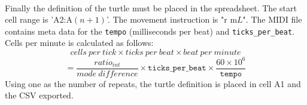 \paragraph{} Finally the definition of the turtle must be placed in the spreadsheet. The start cell range is 'A2:A$(n+1)$'. The movement instruction is "r m$L$". The MIDI file contains meta data for the \texttt{tempo} (milliseconds per beat) and \texttt{ticks\_per\_beat}. Cells per minute is calculated as follows:
  $$cells\ per\ tick \times ticks\ per\ beat \times beat\ per\ minute$$
  $$= \frac{ratio_{int}}{mode\ difference} \times \texttt{ticks\_per\_beat} \times \frac{60 \times 10^6}{\texttt{tempo}}$$
Using one as the number of repeats, the turtle definition is placed in cell A1 and the CSV exported.


